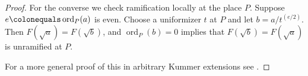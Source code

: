 \documentclass{dcthesis}
\newcommand{\PP}{\mathbb P}
\newcommand{\mm}[1]{{\color{blue} \sf MM: [#1]}}
\newcommand{\FF}{\mathbb{F}}
\DeclareMathOperator{\Div}{Div}
\DeclareMathOperator{\Pic}{Pic}
\DeclareMathOperator{\ord}{ord}
\numberwithin{equation}{section}
\theoremstyle{definition}
\theoremstyle{remark}
\begin{document}
{{{\begin{proof}
      For the converse
      we check ramification locally
      at the place $P$.
      Suppose $e\colonequals\ord_P(a)$ is even.
      Choose a uniformizer $t$ at $P$
      and let $b = a/t^{(e/2)}$.
      Then $F(\sqrt{a}) = F(\sqrt{b})$,
      and $\ord_P(b) = 0$ implies
      that $F(\sqrt{b}) = F(\sqrt{a})$
      is unramified at $P$.
      \par
      For a more general proof
      of this in
      arbitrary Kummer extensions
      see \cite[Proposition 10.3]{rosen}.
    \end{proof}
}}}
\end{document}
